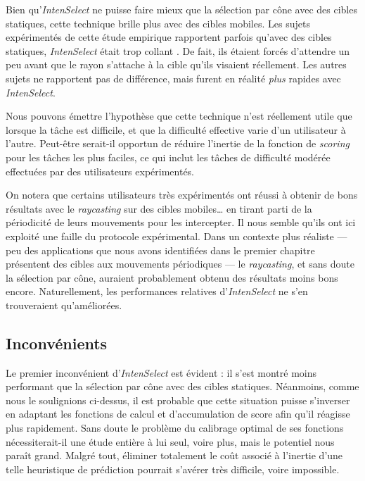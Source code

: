 	Bien qu'\emph{IntenSelect} ne puisse faire mieux que la sélection par cône avec des cibles statiques, cette technique brille plus avec des cibles mobiles. Les sujets expérimentés de cette étude empirique rapportent parfois qu'avec des cibles statiques, \emph{IntenSelect} était trop \og collant \fg{}. De fait, ils étaient forcés d'attendre un peu avant que le rayon s'attache à la cible qu'ils visaient réellement. Les autres sujets ne rapportent pas de différence, mais furent en réalité \emph{plus} rapides avec \emph{IntenSelect}.
	
	Nous pouvons émettre l'hypothèse que cette technique n'est réellement utile que lorsque la tâche est difficile, et que la difficulté effective varie d'un utilisateur à l'autre. Peut-être serait-il opportun de réduire l'inertie de la fonction de \emph{scoring} pour les tâches les plus faciles, ce qui inclut les tâches de difficulté modérée effectuées par des utilisateurs expérimentés.
	
	On notera que certains utilisateurs très expérimentés ont réussi à obtenir de bons résultats avec le \emph{raycasting} sur des cibles mobiles\ldots{} en tirant parti de la périodicité de leurs mouvements pour les intercepter. Il nous semble qu'ils ont ici exploité une faille du protocole expérimental. Dans un contexte plus réaliste --- peu des applications que nous avons identifiées dans le premier chapitre présentent des cibles aux mouvements périodiques --- le \emph{raycasting}, et sans doute la sélection par cône, auraient probablement obtenu des résultats moins bons encore. Naturellement, les performances relatives d'\emph{IntenSelect} ne s'en trouveraient qu'améliorées.
	
	\subsection{Inconvénients}
	Le premier inconvénient d'\emph{IntenSelect} est évident : il s'est montré moins performant que la sélection par cône avec des cibles statiques. Néanmoins, comme nous le soulignions ci-dessus, il est probable que cette situation puisse s'inverser en adaptant les fonctions de calcul et d'accumulation de score afin qu'il réagisse plus rapidement. Sans doute le problème du calibrage optimal de ses fonctions nécessiterait-il une étude entière à lui seul, voire plus, mais le potentiel nous paraît grand. Malgré tout, éliminer totalement le coût associé à l'inertie d'une telle heuristique de prédiction pourrait s'avérer très difficile, voire impossible.
	
